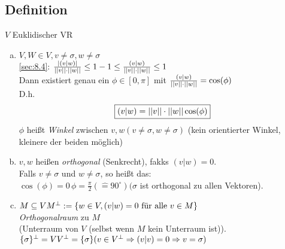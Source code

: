 \subsection{}\label{sec:\thesubsection}
\subsection{}\label{sec:\thesubsection}
\subsection{}\label{sec:\thesubsection}
\subsection{Definition}\label{sec:\thesubsection}
$V$ Euklidischer VR
\begin{enumerate}[a)]
\item $V,W \in V, v \ne \sigma,w \ne \sigma$\\
\ref{sec:8.4}: $\frac{\lvert (v|w) \rvert}{\lvert \lvert v \rvert \rvert \cdot \lvert \lvert w \rvert \rvert} \leq 1\\
-1 \leq \frac{(v|w)}{\lvert \lvert v \rvert \rvert \cdot \lvert \lvert w \rvert \rvert} \leq 1$\\
Dann existiert genau ein $\phi \in [0,\pi]$ mit $\frac{(v|w)}{\lvert \lvert v \rvert \rvert \cdot \lvert \lvert w \rvert \rvert} = \cos(\phi) $\\
D.h.
\begin{equation*}
\boxed{(v|w) = {\lvert \lvert v \rvert \rvert \cdot \lvert \lvert w \rvert \rvert \cos(\phi)}}
\end{equation*}
$\phi$ hei\ss t \emph{Winkel} zwischen $v,w (v \ne \sigma, w \ne \sigma)$ (kein orientierter Winkel, kleinere der beiden möglich)
\item $v,w$ hei\ss en \emph{orthogonal} (Senkrecht), fakks $(v|w) = 0$.\\
Falls $v \ne \sigma$ und $w \ne \sigma$, so hei\ss t das:\\
$\cos(\phi) = 0\,\phi = \frac{\pi}{2} (\hat{=} 90^{\circ}) (\sigma $ ist orthogonal zu allen Vektoren).
\item $M \subseteq V\\
M^{\perp} := \{w \in V, (v|w) = 0 \text{ für alle }v \in M  \}$\\
\emph{Orthogonalraum} zu $M$\\
(Unterraum von $V$ (selbst wenn $M$ kein Unterraum ist)).\\
$\{ \sigma \}^{\perp} = V\\
V^{\perp} = \{ \sigma \}
(v \in V^{\perp} \Rightarrow (v|v) = 0 \Rightarrow v = \sigma)$
\end{enumerate}
